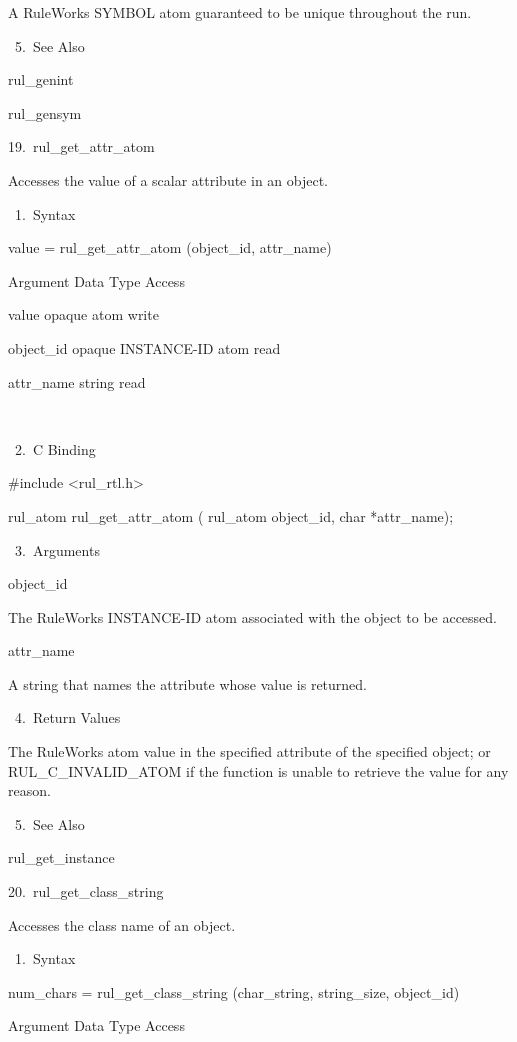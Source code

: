           A RuleWorks SYMBOL atom guaranteed
          to be unique throughout the run.

       5. See Also

    rul_genint

    rul_gensym

19. rul_get_attr_atom

    Accesses the value of a scalar attribute
    in an object.

       1. Syntax

          value = rul_get_attr_atom
          (object_id, attr_name)

          Argument  Data Type     Access

          value  opaque atom    write

          object_id  opaque INSTANCE-ID atom
           read

          attr_name  string     read

           

       2. C Binding

          #include <rul_rtl.h>

          rul_atom rul_get_attr_atom (
          rul_atom object_id,
          char *attr_name);

       3. Arguments

          object_id

          The RuleWorks INSTANCE-ID atom
          associated with the object to be
          accessed.

          attr_name

          A string that names the attribute
          whose value is returned.

       4. Return Values

          The RuleWorks atom value in the
          specified attribute of the specified
          object; or RUL_C_INVALID_ATOM if the
          function is unable to retrieve the
          value for any reason.

       5. See Also

    rul_get_instance

20. rul_get_class_string

    Accesses the class name of an object.

       1. Syntax

          num_chars = rul_get_class_string
          (char_string, string_size,
          object_id)

          Argument  Data Type     Access

